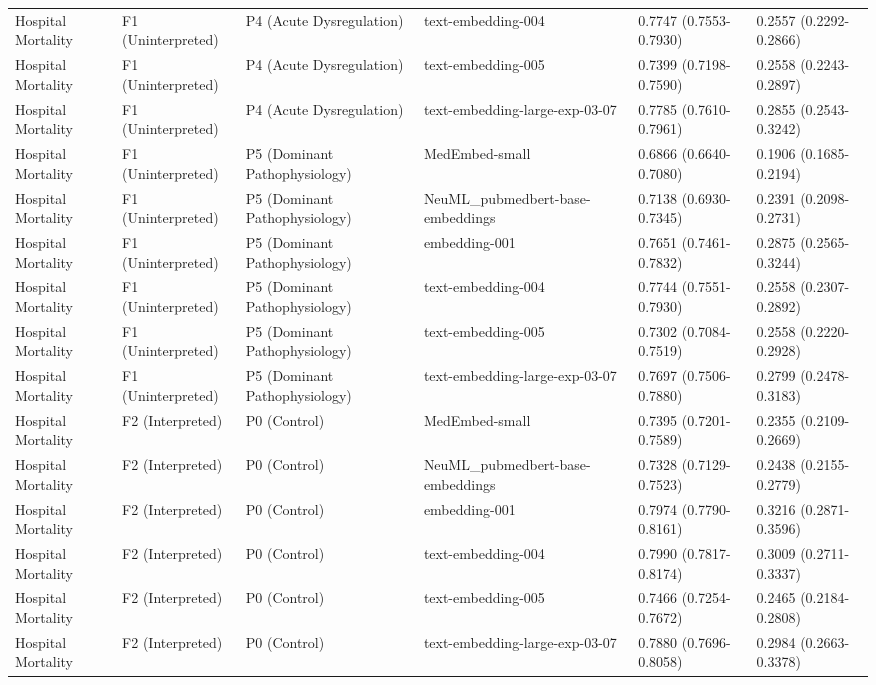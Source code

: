 \begin{tabular}{llllll}
Hospital Mortality & F1 (Uninterpreted) & P4 (Acute Dysregulation) & text-embedding-004 & 0.7747 (0.7553-0.7930) & 0.2557 (0.2292-0.2866) \\
Hospital Mortality & F1 (Uninterpreted) & P4 (Acute Dysregulation) & text-embedding-005 & 0.7399 (0.7198-0.7590) & 0.2558 (0.2243-0.2897) \\
Hospital Mortality & F1 (Uninterpreted) & P4 (Acute Dysregulation) & text-embedding-large-exp-03-07 & 0.7785 (0.7610-0.7961) & 0.2855 (0.2543-0.3242) \\
Hospital Mortality & F1 (Uninterpreted) & P5 (Dominant Pathophysiology) & MedEmbed-small & 0.6866 (0.6640-0.7080) & 0.1906 (0.1685-0.2194) \\
Hospital Mortality & F1 (Uninterpreted) & P5 (Dominant Pathophysiology) & NeuML\_pubmedbert-base-embeddings & 0.7138 (0.6930-0.7345) & 0.2391 (0.2098-0.2731) \\
Hospital Mortality & F1 (Uninterpreted) & P5 (Dominant Pathophysiology) & embedding-001 & 0.7651 (0.7461-0.7832) & 0.2875 (0.2565-0.3244) \\
Hospital Mortality & F1 (Uninterpreted) & P5 (Dominant Pathophysiology) & text-embedding-004 & 0.7744 (0.7551-0.7930) & 0.2558 (0.2307-0.2892) \\
Hospital Mortality & F1 (Uninterpreted) & P5 (Dominant Pathophysiology) & text-embedding-005 & 0.7302 (0.7084-0.7519) & 0.2558 (0.2220-0.2928) \\
Hospital Mortality & F1 (Uninterpreted) & P5 (Dominant Pathophysiology) & text-embedding-large-exp-03-07 & 0.7697 (0.7506-0.7880) & 0.2799 (0.2478-0.3183) \\
Hospital Mortality & F2 (Interpreted) & P0 (Control) & MedEmbed-small & 0.7395 (0.7201-0.7589) & 0.2355 (0.2109-0.2669) \\
Hospital Mortality & F2 (Interpreted) & P0 (Control) & NeuML\_pubmedbert-base-embeddings & 0.7328 (0.7129-0.7523) & 0.2438 (0.2155-0.2779) \\
Hospital Mortality & F2 (Interpreted) & P0 (Control) & embedding-001 & 0.7974 (0.7790-0.8161) & 0.3216 (0.2871-0.3596) \\
Hospital Mortality & F2 (Interpreted) & P0 (Control) & text-embedding-004 & 0.7990 (0.7817-0.8174) & 0.3009 (0.2711-0.3337) \\
Hospital Mortality & F2 (Interpreted) & P0 (Control) & text-embedding-005 & 0.7466 (0.7254-0.7672) & 0.2465 (0.2184-0.2808) \\
Hospital Mortality & F2 (Interpreted) & P0 (Control) & text-embedding-large-exp-03-07 & 0.7880 (0.7696-0.8058) & 0.2984 (0.2663-0.3378) \\

\end{tabular}
